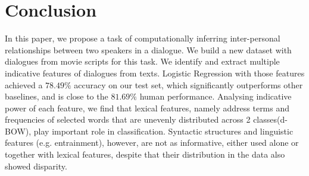 \section{Conclusion}
\label{sec:conclusion}
In this paper, we propose a task of computationally inferring inter-personal
relationships between two speakers in a dialogue. 
We build a new dataset with dialogues from movie scripts for this task. 
We identify and extract multiple indicative features of dialogues from texts. 
Logistic Regression with those features achieved a $78.49\%$ accuracy on 
our test set, which significantly outperforms other baselines,
and is close to the $81.69\%$ human performance. 
Analysing indicative power of each feature, we find that lexical features, 
namely address terms and frequencies
of selected words that are unevenly distributed across 2 classes(d-BOW), 
play important role in classification. Syntactic structures and 
linguistic features (e.g. entrainment), however, are not as informative,
either used alone or together with lexical features, despite that their 
distribution in the data also showed disparity.

